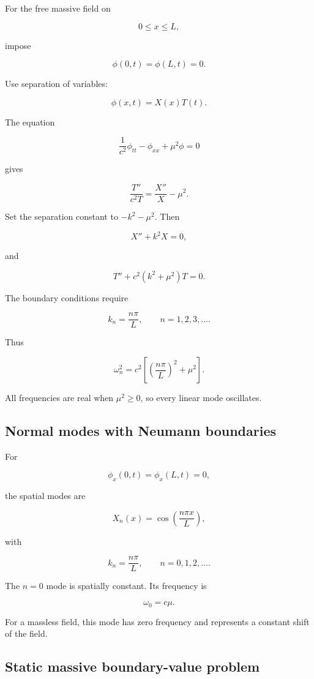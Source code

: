For the free massive field on

\[
0\leq x\leq L,
\]

impose

\[
\phi(0,t)=
\phi(L,t)=0.
\]

Use separation of variables:

\[
\phi(x,t)=X(x)T(t).
\]

The equation

\[
\frac{1}{c^{2}}\phi_{tt}
-
\phi_{xx}
+
\mu^{2}\phi=0
\]

gives

\[
\frac{T''}{c^{2}T}
=
\frac{X''}{X}
-
\mu^{2}.
\]

Set the separation constant to \(-k^{2}-\mu^{2}\). Then

\[
X''+k^{2}X=0,
\]

and

\[
T''+c^{2}(k^{2}+\mu^{2})T=0.
\]

The boundary conditions require

\[
\boxed{
k_{n}=\frac{n\pi}{L},
\qquad
n=1,2,3,\ldots
}.
\]

Thus

\[
\boxed{
\omega_{n}^{2}
=
c^{2}
\left[
\left(
\frac{n\pi}{L}
\right)^{2}
+
\mu^{2}
\right]
}.
\]

All frequencies are real when \(\mu^{2}\geq0\), so every linear mode oscillates.

\subsection{Normal modes with Neumann boundaries}

For

\[
\phi_{x}(0,t)
=
\phi_{x}(L,t)
=0,
\]

the spatial modes are

\[
X_{n}(x)
=
\cos
\left(
\frac{n\pi x}{L}
\right),
\]

with

\[
\boxed{
k_{n}=\frac{n\pi}{L},
\qquad
n=0,1,2,\ldots
}.
\]

The \(n=0\) mode is spatially constant. Its frequency is

\[
\boxed{
\omega_{0}=c\mu
}.
\]

For a massless field, this mode has zero frequency and represents a constant shift of the field.

\subsection{Static massive boundary-value problem}

